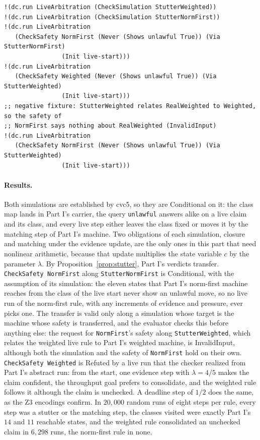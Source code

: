 \documentclass[11pt]{article}
\newcommand{\code}[1]{\texttt{#1}}
\theoremstyle{definition}
\theoremstyle{plain}
\begin{document}
\begin{lstlisting}[style=mettamod]
!(dc.run LiveArbitration (CheckSimulation StutterWeighted))
!(dc.run LiveArbitration (CheckSimulation StutterNormFirst))
!(dc.run LiveArbitration
   (CheckSafety NormFirst (Never (Shows unlawful True)) (Via StutterNormFirst)
                (Init live-start)))
!(dc.run LiveArbitration
   (CheckSafety Weighted (Never (Shows unlawful True)) (Via StutterWeighted)
                (Init live-start)))
;; negative fixture: StutterWeighted relates RealWeighted to Weighted, so the safety of
;; NormFirst says nothing about RealWeighted (InvalidInput)
!(dc.run LiveArbitration
   (CheckSafety NormFirst (Never (Shows unlawful True)) (Via StutterWeighted)
                (Init live-start)))
\end{lstlisting}

\paragraph{Results.} Both simulations are established by cvc5, so they are Conditional on it: the
class map lands in Part I's carrier, the
query \code{unlawful} answers alike on a live claim and its class, and every live step either leaves
the class fixed or moves it by the matching step of Part I's machine. Two obligations of each
simulation, closure and matching under the evidence update, are the only ones in this part that need
nonlinear arithmetic, because that update multiplies the state variable $c$ by the parameter
$\lambda$. By Proposition~\ref{prop:stutter}, Part I's verdicts transfer. \code{CheckSafety
NormFirst} along \code{StutterNormFirst} is Conditional, with the assumption of its simulation: the
eleven states that Part I's norm-first machine reaches from the class of the live start never show
an unlawful move, so no live run of the norm-first rule, with any increments of evidence and
pressure, ever picks one. The transfer is valid only along a simulation whose target is the machine
whose safety is transferred, and the evaluator checks this before anything else: the request for
\code{NormFirst}'s safety along \code{StutterWeighted}, which relates the weighted live rule to
Part I's weighted machine, is InvalidInput, although both the simulation and the safety of
\code{NormFirst} hold on their own. \code{CheckSafety Weighted} is Refuted by a
live run that the checker realized from Part I's abstract run: from the start, one evidence step
with $\lambda=4/5$ makes the claim confident, the throughput goal prefers to consolidate, and the
weighted rule follows it although the claim is unchecked. A deadline step of $1/2$ does the same, as
the Z3 encodings confirm. In $20{,}000$ random runs of eight steps per rule, every step was a
stutter or the matching step, the classes visited were exactly Part I's $14$ and $11$ reachable
states, and the weighted rule consolidated an unchecked claim in $6{,}298$ runs, the norm-first rule
in none.
\end{document}
